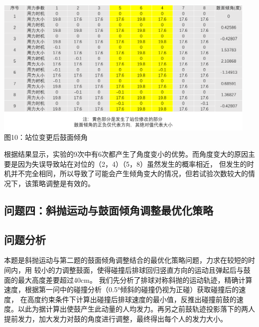 \documentclass[UTF8]{article}
\begin{document}
\begin{center}
    \includegraphics[width=0.95\textwidth]{figure14.png}\\ 
    图10：站位变更后鼓面倾角  
\end{center}

根据结果显示，实验的9次中有6次都产生了角度变小的优势。而角度变大的原因主要是因为失误导致站在对位的（2，4）（5，8）虽然发生的概率相近，
但发生的时机并不完全相同，所以导致了可能会产生倾角变大的情况，但若试验次数较大的情况下，该策略调整是有效的。


\begin{center}
    \section{问题四：斜抛运动与鼓面倾角调整最优化策略}  
\end{center}

\subsection{问题分析}
本题是斜抛运动与第二题的鼓面倾角调整结合的最优化策略问题，力求在较短的时间内，用
较小的力调整鼓面，使得碰撞后排球回归竖直方向的运动且弹起后与鼓面的最大高度差要超过40cm。
我们先分析了排球对称斜抛的运动轨迹，精确计算速度，根据第一问中的碰撞分析（0.5°倾斜的碰撞仍视为正碰）获取碰撞后的速度，
在高度约束条件下计算出碰撞后排球速度的最小值，反推出碰撞前鼓的速度。以此为据计算出使鼓产生此动量的人均发力。再另之前鼓轨迹投影落下的两人
提前发力，加大发力对鼓的角度进行调整，最终得出每个人的发力大小。\\
\end{document}

